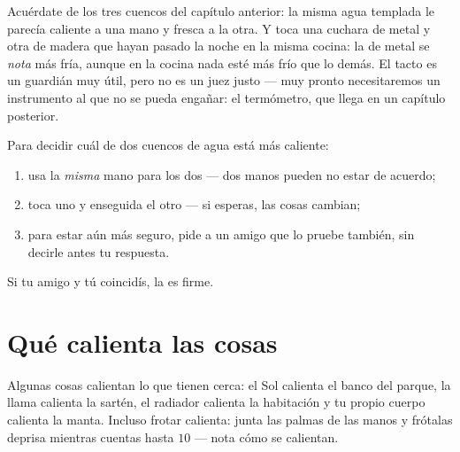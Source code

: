 \begin{remark}\label{rem:g1:hot-and-cold:fooled}
Acuérdate de los tres cuencos del capítulo anterior: la misma agua
templada le parecía caliente a una mano y fresca a la otra. Y toca una
cuchara de metal y otra de madera que hayan pasado la noche en la
misma cocina: la de metal se \emph{nota} más fría, aunque en la cocina
nada esté más frío que lo demás. El tacto es un guardián muy útil,
pero no es un juez justo --- muy pronto necesitaremos un instrumento
al que no se pueda engañar: el termómetro, que llega en un capítulo
posterior.
\end{remark}

\begin{method}\label{met:g1:hot-and-cold:compare}
Para decidir cuál de dos cuencos de agua está más caliente:
\begin{enumerate}
  \item usa la \emph{misma} mano para los dos --- dos manos pueden no
        estar de acuerdo;
  \item toca uno y enseguida el otro --- si esperas, las cosas
        cambian;
  \item para estar aún más seguro, pide a un amigo que lo pruebe
        también, sin decirle antes tu respuesta.
\end{enumerate}
Si tu amigo y tú coincidís, la  es firme.
\end{method}

\section{Qué calienta las cosas}

\begin{example}\label{ex:g1:hot-and-cold:warmers}
Algunas cosas calientan lo que tienen cerca: el Sol calienta el banco
del parque, la llama calienta la sartén, el radiador calienta la
habitación y tu propio cuerpo calienta la manta. Incluso frotar
calienta: junta las palmas de las manos y frótalas deprisa mientras
cuentas hasta $10$ --- nota cómo se calientan.
\end{example}

